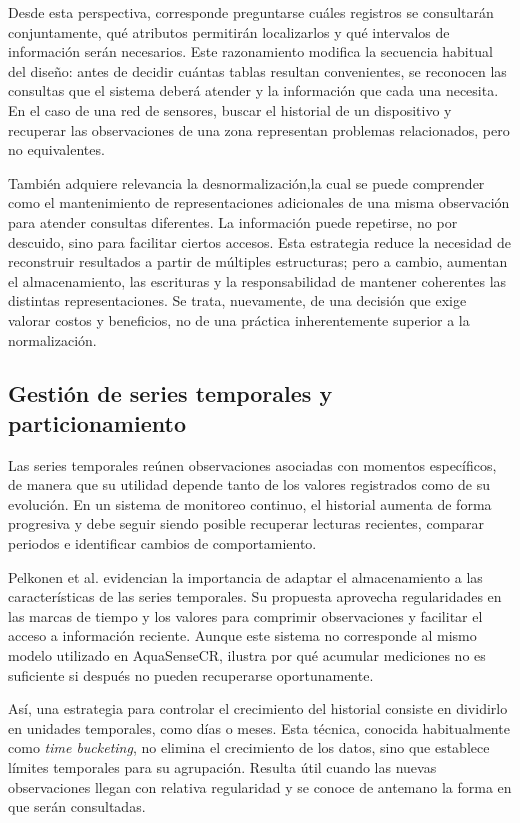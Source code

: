 \documentclass[conference]{IEEEtran}
\begin{document}
Desde esta perspectiva, corresponde preguntarse cuáles registros se consultarán conjuntamente, qué atributos permitirán localizarlos y qué intervalos de información serán necesarios. Este razonamiento modifica la secuencia habitual del diseño: antes de decidir cuántas tablas resultan convenientes, se reconocen las consultas que el sistema deberá atender y la información que cada una necesita. En el caso de una red de sensores, buscar el historial de un dispositivo y recuperar las observaciones de una zona representan problemas relacionados, pero no equivalentes.

También adquiere relevancia la desnormalización,la cual se puede comprender como el mantenimiento de representaciones adicionales de una misma observación para atender consultas diferentes. La información puede repetirse, no por descuido, sino para facilitar ciertos accesos. Esta estrategia reduce la necesidad de reconstruir resultados a partir de múltiples estructuras; pero a cambio, aumentan el almacenamiento, las escrituras y la responsabilidad de mantener coherentes las distintas representaciones. Se trata, nuevamente, de una decisión que exige valorar costos y  beneficios, no de una práctica inherentemente superior a la normalización.

\subsection{Gestión de series temporales y particionamiento}

Las series temporales reúnen observaciones asociadas con momentos específicos, de manera que su utilidad depende tanto de los valores registrados como de su evolución. En un sistema de monitoreo continuo, el historial aumenta de forma progresiva y debe seguir siendo posible recuperar lecturas recientes, comparar periodos e identificar cambios de comportamiento.

Pelkonen et al. \cite{pelkonen15} evidencian la importancia de adaptar el almacenamiento a las características de las series temporales. Su propuesta aprovecha regularidades en las marcas de tiempo y los valores para comprimir observaciones y facilitar el acceso a información reciente. Aunque este sistema no corresponde al mismo modelo utilizado en AquaSenseCR, ilustra por qué acumular mediciones no es suficiente si después no pueden recuperarse oportunamente. 

Así, una estrategia para controlar el crecimiento del historial consiste en dividirlo en unidades temporales, como días o meses. Esta técnica, conocida habitualmente como \textit{time bucketing}, no elimina el crecimiento de los datos, sino que establece límites temporales para su agrupación. Resulta útil cuando las nuevas observaciones llegan con relativa regularidad y se conoce de antemano la forma en que serán consultadas. 
\end{document}
